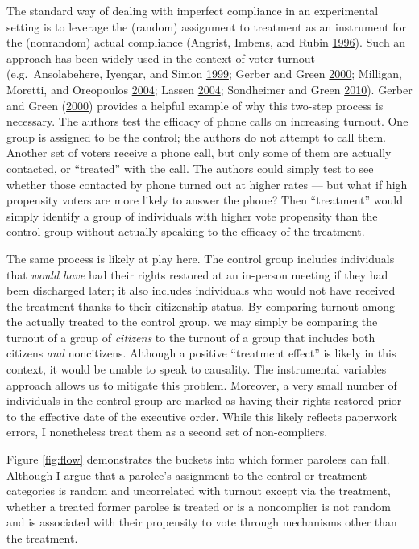 \documentclass[
  12pt,
]{article}
\begin{document}
The standard way of dealing with imperfect compliance in an experimental setting is to leverage the (random) assignment to treatment as an instrument for the (nonrandom) actual compliance (Angrist, Imbens, and Rubin \protect\hyperlink{ref-Angrist1996}{1996}). Such an approach has been widely used in the context of voter turnout (e.g.~Ansolabehere, Iyengar, and Simon \protect\hyperlink{ref-Ansolabehere1999}{1999}; Gerber and Green \protect\hyperlink{ref-Gerber2000}{2000}; Milligan, Moretti, and Oreopoulos \protect\hyperlink{ref-Milligan2004}{2004}; Lassen \protect\hyperlink{ref-Lassen2004}{2004}; Sondheimer and Green \protect\hyperlink{ref-Sondheimer2010}{2010}). Gerber and Green (\protect\hyperlink{ref-Gerber2000}{2000}) provides a helpful example of why this two-step process is necessary. The authors test the efficacy of phone calls on increasing turnout. One group is assigned to be the control; the authors do not attempt to call them. Another set of voters receive a phone call, but only some of them are actually contacted, or ``treated'' with the call. The authors could simply test to see whether those contacted by phone turned out at higher rates --- but what if high propensity voters are more likely to answer the phone? Then ``treatment'' would simply identify a group of individuals with higher vote propensity than the control group without actually speaking to the efficacy of the treatment.

The same process is likely at play here. The control group includes individuals that \emph{would have} had their rights restored at an in-person meeting if they had been discharged later; it also includes individuals who would not have received the treatment thanks to their citizenship status. By comparing turnout among the actually treated to the control group, we may simply be comparing the turnout of a group of \emph{citizens} to the turnout of a group that includes both citizens \emph{and} noncitizens. Although a positive ``treatment effect'' is likely in this context, it would be unable to speak to causality. The instrumental variables approach allows us to mitigate this problem. Moreover, a very small number of individuals in the control group are marked as having their rights restored prior to the effective date of the executive order. While this likely reflects paperwork errors, I nonetheless treat them as a second set of non-compliers.

Figure \ref{fig:flow} demonstrates the buckets into which former parolees can fall. Although I argue that a parolee's assignment to the control or treatment categories is random and uncorrelated with turnout except via the treatment, whether a treated former parolee is treated or is a noncomplier is not random and is associated with their propensity to vote through mechanisms other than the treatment.
\end{document}
